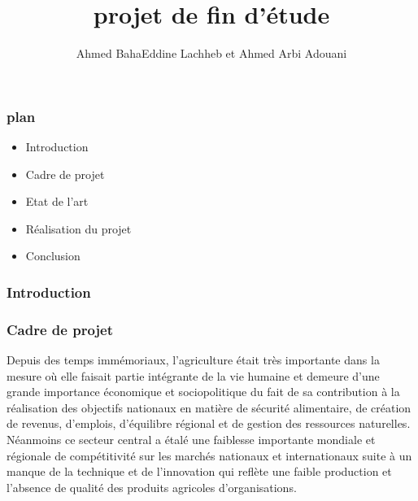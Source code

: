 \documentclass{beamer}
\title{projet de fin d'étude}
\author{Ahmed BahaEddine Lachheb et Ahmed Arbi Adouani}
\institute{Institut Supérieur Des Etudes Technologiques De Beja}
\begin{document}
	
	 \begin{frame}
		\titlepage{}
	 \end{frame}

 \begin{frame}
 	\frametitle{plan}		
 \begin{itemize}
	\item Introduction
	\item Cadre de projet
	\item Etat de l'art
	\item Réalisation du projet
	\item Conclusion
 \end{itemize}
 \end{frame}
 \begin{frame}
\frametitle{Introduction}		
 \end{frame}
 \begin{frame}
\frametitle{Cadre de projet}		
  \begin{block}{\centering{}} 
Depuis des temps immémoriaux, l'agriculture était très importante dans la mesure où elle faisait partie intégrante de la vie humaine et demeure d'une grande importance économique et sociopolitique du fait de sa contribution à la réalisation des objectifs nationaux en matière de sécurité alimentaire, de création de revenus, d'emplois, d'équilibre régional et de gestion des ressources naturelles. Néanmoins ce secteur central a étalé une faiblesse importante mondiale et régionale de compétitivité sur les marchés nationaux et internationaux suite à un manque de la technique et de l'innovation qui reflète une faible production et l'absence de qualité des produits agricoles d'organisations.

\end{block}		
\end{frame}
\end{document}
